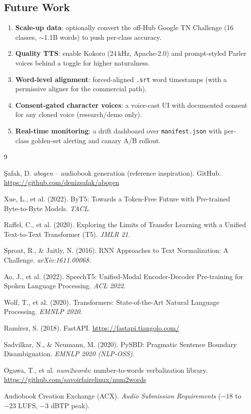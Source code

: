 \documentclass[12pt,a4paper]{article}
\begin{document}
\subsection{Future Work}

\begin{enumerate}\setlength\itemsep{0.15em}
  \item \textbf{Scale-up data}: optionally convert the off-Hub Google TN Challenge (16 classes, $\sim$1.1B words) to push per-class accuracy.
  \item \textbf{Quality TTS}: enable Kokoro (24\,kHz, Apache-2.0) and prompt-styled Parler voices behind a toggle for higher naturalness.
  \item \textbf{Word-level alignment}: forced-aligned \texttt{.srt} word timestamps (with a permissive aligner for the commercial path).
  \item \textbf{Consent-gated character voices}: a voice-cast UI with documented consent for any cloned voice (research/demo only).
  \item \textbf{Real-time monitoring}: a drift dashboard over \texttt{manifest.json} with per-class golden-set alerting and canary A/B rollout.
\end{enumerate}

\newpage
\begin{thebibliography}{9}

 \c{S}afak, D. \textit{abogen} -- audiobook generation (reference inspiration). GitHub. \url{https://github.com/denizsafak/abogen}

 Xue, L., et al. (2022). ByT5: Towards a Token-Free Future with Pre-trained Byte-to-Byte Models. \textit{TACL}.

 Raffel, C., et al. (2020). Exploring the Limits of Transfer Learning with a Unified Text-to-Text Transformer (T5). \textit{JMLR 21}.

 Sproat, R., \& Jaitly, N. (2016). RNN Approaches to Text Normalization: A Challenge. \textit{arXiv:1611.00068}.

 Ao, J., et al. (2022). SpeechT5: Unified-Modal Encoder-Decoder Pre-training for Spoken Language Processing. \textit{ACL 2022}.

 Wolf, T., et al. (2020). Transformers: State-of-the-Art Natural Language Processing. \textit{EMNLP 2020}.

 Ram\'irez, S. (2018). FastAPI. \url{https://fastapi.tiangolo.com/}

 Sadvilkar, N., \& Neumann, M. (2020). PySBD: Pragmatic Sentence Boundary Disambiguation. \textit{EMNLP 2020 (NLP-OSS)}.

 Ogawa, T., et al. \textit{num2words}: number-to-words verbalization library. \url{https://github.com/savoirfairelinux/num2words}

 Audiobook Creation Exchange (ACX). \textit{Audio Submission Requirements} ($-18$ to $-23$ LUFS, $-3$ dBTP peak).

\end{thebibliography}
\end{document}

